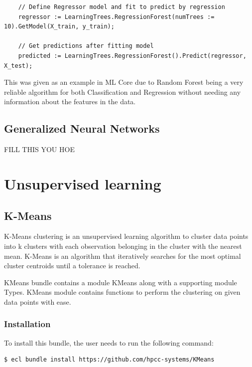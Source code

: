 \documentclass[a4paper,oneside,12pt]{book}
\begin{document}
\begin{lstlisting}
    // Define Regressor model and fit to predict by regression
    regressor := LearningTrees.RegressionForest(numTrees := 10).GetModel(X_train, y_train);

    // Get predictions after fitting model
    predicted := LearningTrees.RegressionForest().Predict(regressor, X_test);
\end{lstlisting}

This was given as an example in ML Core due to Random Forest being a very reliable algorithm for both Classification and Regression without needing any information about the features in the data.

\chapter{Generalized Neural Networks}\label{supe:gnn}

FILL THIS YOU HOE

\part{Unsupervised learning}\label{part:unsupe}

\chapter{K-Means}\label{unsupe:kmeans}

K-Means clustering is an unsupervised learning algorithm to cluster data points into k clusters with each observation belonging in the cluster with the nearest mean. K-Means is an algorithm that iteratively searches for the most optimal cluster centroids until a tolerance is reached.

KMeans bundle contains a module KMeans along with a supporting module Types. KMeans module contains functions to perform the clustering on given data points with ease.

\section{Installation}

To install this bundle, the user needs to run the following command:

\begin{lstlisting}[language=bash]
    $ ecl bundle install https://github.com/hpcc-systems/KMeans
\end{lstlisting}
\end{document}
